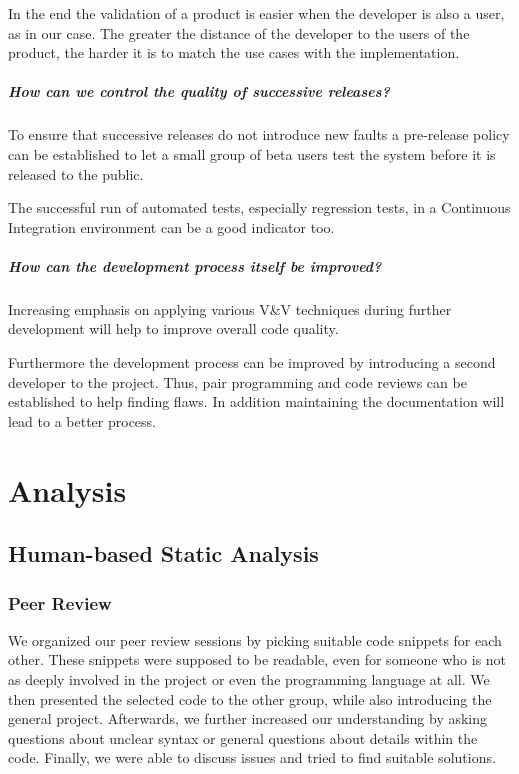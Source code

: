 \documentclass{scrreprt}
\begin{document}
In the end the validation of a product is easier when the developer is also a user, as in our case. The greater the distance of the developer to the users of the product, the harder it is to match the use cases with the implementation. 

\paragraph{How can we control the quality of successive releases?}

To ensure that successive releases do not introduce new faults a pre-release policy can be established to let a small group of beta users test the system before it is released to the public.

The successful run of automated tests, especially regression tests, in a Continuous Integration environment can be a good indicator too.

\paragraph{How can the development process itself be improved?}

Increasing emphasis on applying various V\&V techniques during further development will help to improve overall code quality. 

Furthermore the development process can be improved by introducing a second developer to the project. Thus, pair programming and code reviews can be established to help finding flaws. In addition maintaining the documentation will lead to a better process.


\chapter{Analysis}

\section{Human-based Static Analysis}

\subsection{Peer Review}

We organized our peer review sessions by picking suitable code snippets for each other. These snippets were supposed to be readable, even for someone who is not as deeply involved in the project or even the programming language at all. We then presented the selected code to the other group, while also introducing the general project. Afterwards, we further increased our understanding by asking questions about unclear syntax or general questions about details within the code. Finally, we were able to discuss issues and tried to find suitable solutions.
\end{document}
